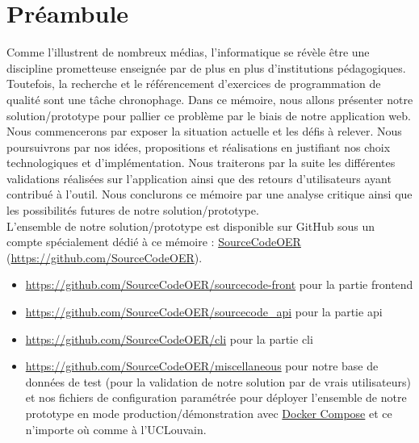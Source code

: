 \chapter*{Préambule}


Comme l'illustrent de nombreux médias, l'informatique se révèle être une discipline prometteuse enseignée par de plus en plus d'institutions pédagogiques. Toutefois, la recherche et le référencement d'exercices de programmation de qualité sont une tâche chronophage.
Dans ce mémoire, nous allons présenter notre solution/prototype pour pallier ce problème par le biais de notre application web. Nous commencerons par exposer la situation actuelle et les défis à relever. Nous poursuivrons par nos idées, propositions et réalisations en justifiant nos choix technologiques et d'implémentation. Nous traiterons par la suite les différentes validations réalisées sur l'application ainsi que des retours d'utilisateurs ayant contribué à l'outil. Nous conclurons ce mémoire par une analyse critique ainsi que les possibilités futures de notre solution/prototype. \\

L'ensemble de notre solution/prototype est disponible sur GitHub sous un compte spécialement dédié à ce mémoire : 
\href{https://github.com/SourceCodeOER}{SourceCodeOER} (\href{https://github.com/SourceCodeOER}{https://github.com/SourceCodeOER}).

\begin{itemize}
    \item \href{https://github.com/SourceCodeOER/sourcecode-front}{https://github.com/SourceCodeOER/sourcecode-front} pour la partie \gls{frontend}
    \item \href{https://github.com/SourceCodeOER/sourcecode\_api}{https://github.com/SourceCodeOER/sourcecode\_api} pour la partie \Gls{api}
    \item \href{https://github.com/SourceCodeOER/cli}{https://github.com/SourceCodeOER/cli} pour la partie \Gls{cli}
    \item \href{https://github.com/SourceCodeOER/miscellaneous}{https://github.com/SourceCodeOER/miscellaneous} pour notre base de données de test (pour la validation de notre solution par de vrais utilisateurs) et nos fichiers de configuration paramétrée pour déployer l'ensemble de notre prototype en mode production/démonstration avec \href{https://docs.docker.com/compose/}{Docker Compose} et ce n'importe où comme à l'UCLouvain.
\end{itemize}

